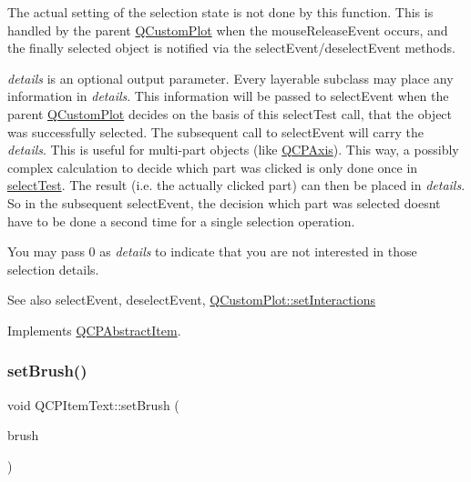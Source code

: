 The actual setting of the selection state is not done by this function. This is handled by the parent \hyperlink{class_q_custom_plot}{Q\+Custom\+Plot} when the mouse\+Release\+Event occurs, and the finally selected object is notified via the select\+Event/deselect\+Event methods.

{\itshape details} is an optional output parameter. Every layerable subclass may place any information in {\itshape details}. This information will be passed to select\+Event when the parent \hyperlink{class_q_custom_plot}{Q\+Custom\+Plot} decides on the basis of this select\+Test call, that the object was successfully selected. The subsequent call to select\+Event will carry the {\itshape details}. This is useful for multi-\/part objects (like \hyperlink{class_q_c_p_axis}{Q\+C\+P\+Axis}). This way, a possibly complex calculation to decide which part was clicked is only done once in \hyperlink{class_q_c_p_item_text_aca74494fd5e769f331a6eb3e29f32916}{select\+Test}. The result (i.\+e. the actually clicked part) can then be placed in {\itshape details}. So in the subsequent select\+Event, the decision which part was selected doesn\textquotesingle{}t have to be done a second time for a single selection operation.

You may pass 0 as {\itshape details} to indicate that you are not interested in those selection details.

\begin{DoxySeeAlso}{See also}
select\+Event, deselect\+Event, \hyperlink{class_q_custom_plot_a5ee1e2f6ae27419deca53e75907c27e5}{Q\+Custom\+Plot\+::set\+Interactions} 
\end{DoxySeeAlso}


Implements \hyperlink{class_q_c_p_abstract_item_a96d522d10ffc0413b9a366c6f7f0476b}{Q\+C\+P\+Abstract\+Item}.

\hypertarget{class_q_c_p_item_text_a1c7e131516df2ed8d941ef31240ded8e}{}\label{class_q_c_p_item_text_a1c7e131516df2ed8d941ef31240ded8e} 
\subsubsection{\texorpdfstring{set\+Brush()}{setBrush()}}
{\footnotesize\ttfamily void Q\+C\+P\+Item\+Text\+::set\+Brush (\begin{DoxyParamCaption}\item[{const Q\+Brush \&}]{brush }\end{DoxyParamCaption})}

